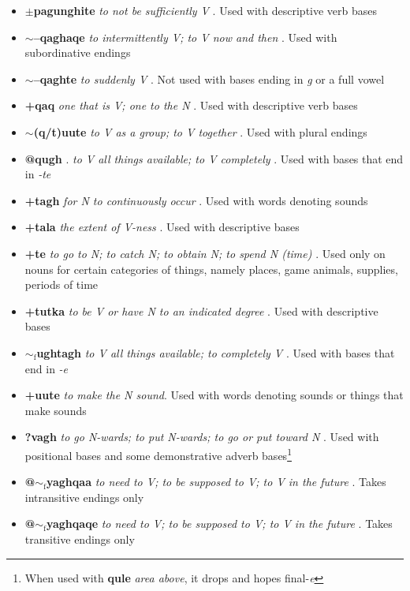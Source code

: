 \documentclass{article}
\begin{document}
\begin{itemize}
\item \textbf{$\pm$pagunghite} \textit{to not be sufficiently V} . Used with descriptive verb bases

\item \textbf{$\sim$--qaghaqe} \textit{to intermittently V; to V now and then} . Used with subordinative endings

\item \textbf{$\sim$--qaghte} \textit{to suddenly V} . Not used with bases ending in \textit{g} or a full vowel

\item \textbf{+qaq} \textit{one that is V; one to the N} . Used with descriptive verb bases

\item \textbf{$\sim$(q/t)uute} \textit{to V as a group; to V together} . Used with plural endings

\item \textbf{@qugh} . \textit{to V all things available; to V completely} . Used with bases that end in \textit{-te}

\item \textbf{+tagh} \textit{for N to continuously occur} . Used with words denoting sounds

\item \textbf{+tala} \textit{the extent of V-ness} . Used with descriptive bases

\item \textbf{+te} \textit{to go to N; to catch N; to obtain N; to spend N (time)} . Used only on nouns for certain categories of things, namely places, game animals, supplies, periods of time

\item \textbf{+tutka} \textit{to be V or have N to an indicated degree} . Used with descriptive bases

\item \textbf{$\sim_\text{f}$ughtagh} \textit{to V all things available; to completely V} . Used with bases that end in \textit{-e}

\item \textbf{+uute} \textit{to make the N sound}. Used with words denoting sounds or things that make sounds

\item \textbf{?vagh} \textit{to go N-wards; to put N-wards; to go or put toward N} . Used with positional bases and some demonstrative adverb bases\footnote{When used with \textbf{qule} \textit{area above}, it drops and hopes final-\textit{e}}

\item \textbf{@$\sim_\text{f}$yaghqaa} \textit{to need to V; to be supposed to V; to V in the future} . Takes intransitive endings only 

\item \textbf{@$\sim_\text{f}$yaghqaqe} \textit{to need to V; to be supposed to V; to V in the future} . Takes transitive endings only
\end{itemize}
\end{document}
